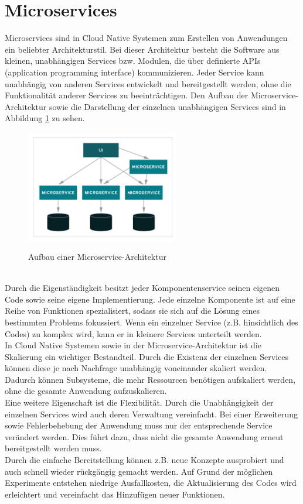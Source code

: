 \section{Microservices}
Microservices sind in Cloud Native Systemen zum Erstellen von Anwendungen ein beliebter Architekturstil. Bei dieser Architektur besteht die Software aus kleinen, unabhängigen Services bzw. Modulen, die über definierte APIs (application programming interface) kommunizieren. Jeder Service kann unabhängig von anderen Services entwickelt und bereitgestellt werden, ohne die Funktionalität anderer Services zu beeinträchtigen. Den Aufbau der Microservice-Architektur sowie die Darstellung der einzelnen unabhängigen Services sind in Abbildung \ref{micro} zu sehen.\\
\begin{figure}[bth] 
	\centering
	\includegraphics[width=0.6\textwidth]{Graphics/Microservice.png}
	\caption{Aufbau einer Microservice-Architektur}
	\label{micro}
	\cite{microBild}
\end{figure}\\
Durch die Eigenständigkeit besitzt jeder Komponentenservice seinen eigenen Code sowie seine eigene Implementierung. Jede einzelne Komponente ist auf eine Reihe von Funktionen spezialisiert, sodass sie sich auf die Lösung eines bestimmten Problems fokussiert. Wenn ein einzelner Service (z.B. hinsichtlich des Codes) zu komplex wird, kann er in kleinere Services unterteilt werden.\\
In Cloud Native Systemen sowie in der Microservice-Architektur ist die Skalierung ein wichtiger Bestandteil. Durch die Existenz der einzelnen Services können diese je nach Nachfrage unabhängig voneinander skaliert werden. Dadurch können Subsysteme, die mehr Ressourcen benötigen aufskaliert werden, ohne die gesamte Anwendung aufzuskalieren.\\
Eine weitere Eigenschaft ist die Flexibilität. Durch die Unabhängigkeit der einzelnen Services wird auch deren Verwaltung vereinfacht. Bei einer Erweiterung sowie Fehlerbehebung der Anwendung muss nur der entsprechende Service verändert werden. Dies führt dazu, dass nicht die gesamte Anwendung erneut bereitgestellt werden muss.\\
Durch die einfache Bereitstellung können z.B. neue Konzepte ausprobiert und auch schnell wieder rückgängig gemacht werden. Auf Grund der möglichen Experimente entstehen niedrige Ausfallkosten, die Aktualisierung des Codes wird erleichtert und vereinfacht das Hinzufügen neuer Funktionen.\cite{microservice}
